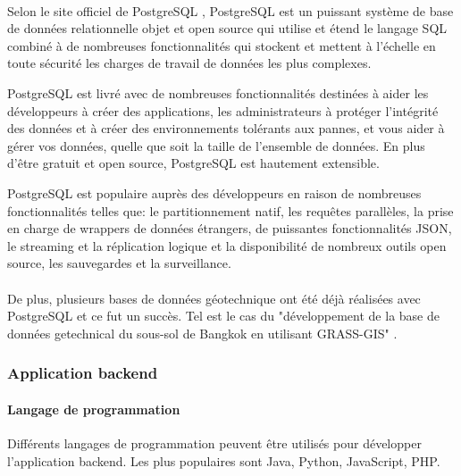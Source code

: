          \paragraph{}
         Selon le site officiel de PostgreSQL \cite{psql},
         PostgreSQL est un puissant système de base de données relationnelle objet et open 
         source qui utilise et étend le langage SQL combiné à de nombreuses fonctionnalités
          qui stockent et mettent à l'échelle en toute sécurité les charges de travail de 
          données les plus complexes.
          \par 
          PostgreSQL est livré avec de nombreuses fonctionnalités destinées à aider les 
          développeurs à créer des applications, les administrateurs à protéger 
          l'intégrité des données et à créer des environnements tolérants aux pannes, 
          et vous aider à gérer vos données, quelle que soit la taille de l'ensemble de 
          données. En plus d'être gratuit et open source, PostgreSQL est hautement extensible.
          \par 
          PostgreSQL est populaire auprès des développeurs en raison de nombreuses fonctionnalités
           telles que: le partitionnement natif, les requêtes parallèles, la prise en charge 
           de wrappers de données étrangers, de puissantes fonctionnalités JSON, le streaming et 
           la réplication logique et la disponibilité de nombreux outils open source,
            les sauvegardes et la surveillance.
            \paragraph{}
            De plus, plusieurs bases de données géotechnique ont été 
            déjà réalisées avec PostgreSQL et ce fut un succès. Tel est le cas du
            "développement de la base de données getechnical du sous-sol de Bangkok 
            en utilisant GRASS-GIS" \cite{panoot2001development}.
        \subsubsection{Application backend}
        \paragraph{Langage de programmation}
        Différents langages de programmation peuvent être utilisés pour développer l'application 
        backend. Les plus populaires sont Java, Python, JavaScript, PHP.
